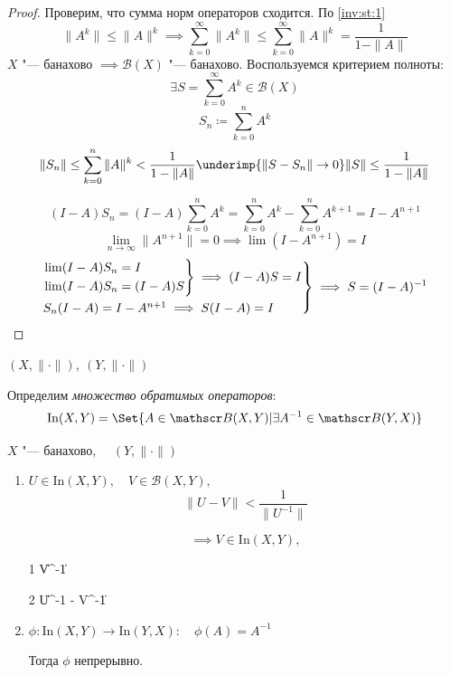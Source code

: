 \begin{proof}
	Проверим, что сумма норм операторов сходится.
	По \autoref{inv:st:1}
	$$ \|A^k\| \le \|A\|^k \implies \sum_{k = 0}^\infty \|A^k\| \le \sum_{k = 0}^\infty \|A\|^k =
	\frac1{1 - \|A\|} $$
	$ X $ "--- банахово $ \implies \mathscr B(X) $ "--- банахово.
	Воспользуемся критерием полноты:
	$$ \exists S = \sum_{k = 0}^\infty A^k \in \mathscr B(X) $$
	$$ S_n \coloneq \sum_{k = 0}^n A^k $$
	$$ \|S_n\| \le \sum_{k = 0}^n \|A\|^k < \frac1{1 - \|A\|} \underimp{\|S - S_n\| \to 0}
	\|S\| \le \frac1{1 - \|A\|} $$

	$$ (I - A)S_n = (I - A) \sum_{k = 0}^n A^k = \sum_{k = 0}^n A^k - \sum_{k = 0}^n A^{k + 1} =
	I - A^{n + 1} $$
	$$ \lim\limits_{n \to \infty} \|A^{n + 1}\| = 0 \implies \lim (I - A^{n + 1}) = I $$
	$$
	\begin{rcases}
		\begin{rcases}
			\lim(I - A)S_n = I \\
			\lim(I - A)S_n = (I - A)S
		\end{rcases} \implies (I - A)S = I \\
		S_n(I - A) = I - A^{n + 1} \implies S(I - A) = I
	\end{rcases} \implies S = (I - A)^{-1} $$
\end{proof}

\begin{definition}
	$ (X, \|\cdot\|), ~ (Y, \|\cdot\|) $

	Определим \emph{множество обратимых операторов}:
	$$ \mathrm{In}(X, Y) = \Set{A \in \mathscr B(X, Y) | \exists A^{-1} \in \mathscr B(Y, X)} $$
\end{definition}

\begin{theorem}
	$ X $ "--- банахово, $ \quad (Y, \|\cdot\|) $
	\begin{enumerate}
		\item $ U \in \mathrm{In}(X, Y), \quad V \in \mathscr B(X, Y), $
			$$ \|U - V\| < \frac1{\|U^{-1}\|} $$

			$$ \implies V \in \mathrm{In}(X, Y), $$
			\begin{equ}1
				\|V^{-1}\| \le {}
			\end{equ}
			\begin{equ}2
				\|U^{-1} - V^{-1}\| \le \frac{\|U^{-1}\|^2 \|U - V\|}{1 - \|U - V\| \cdot \|U^{-1}\|}
			\end{equ}
		\item $ \phi : \mathrm{In}(X, Y) \to \mathrm{In}(Y, X) : \quad \phi(A) = A^{-1} $

			Тогда $ \phi $ непрерывно.
	\end{enumerate}
\end{theorem}

